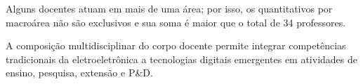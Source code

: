 {\small\color{cinzamedio}Alguns docentes atuam em mais de uma área; por isso, os quantitativos por macroárea não são exclusivos e sua soma é maior que o total de 34 professores.}

A composição multidisciplinar do corpo docente permite integrar competências tradicionais da eletroeletrônica a tecnologias digitais emergentes em atividades de ensino, pesquisa, extensão e P\&D.
